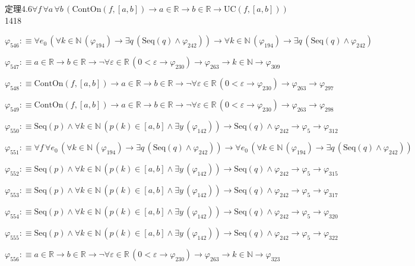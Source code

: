 \begin{fullproof}{定理4.6}{$\forall f\,\forall a\,\forall b\,(\mathrm{ContOn}(f,[a,b]) \to a \in \mathbb{R} \to b \in \mathbb{R} \to \mathrm{UC}(f,[a,b]))$}{1418}
\begin{abbrevlist}
\item $\varphi_{546} :\equiv \forall e_{0}\,(\forall k \in \mathbb{N}\,(\varphi_{194}) \to \exists q\,(\mathrm{Seq}(q) \land \varphi_{242})) \to \forall k \in \mathbb{N}\,(\varphi_{194}) \to \exists q\,(\mathrm{Seq}(q) \land \varphi_{242})$
\item $\varphi_{547} :\equiv a \in \mathbb{R} \to b \in \mathbb{R} \to \neg \forall \varepsilon \in \mathbb{R}\,(0 < \varepsilon \to \varphi_{230}) \to \varphi_{263} \to k \in \mathbb{N} \to \varphi_{309}$
\item $\varphi_{548} :\equiv \mathrm{ContOn}(f,[a,b]) \to a \in \mathbb{R} \to b \in \mathbb{R} \to \neg \forall \varepsilon \in \mathbb{R}\,(0 < \varepsilon \to \varphi_{230}) \to \varphi_{263} \to \varphi_{297}$
\item $\varphi_{549} :\equiv \mathrm{ContOn}(f,[a,b]) \to a \in \mathbb{R} \to b \in \mathbb{R} \to \neg \forall \varepsilon \in \mathbb{R}\,(0 < \varepsilon \to \varphi_{230}) \to \varphi_{263} \to \varphi_{298}$
\item $\varphi_{550} :\equiv \mathrm{Seq}(p) \land \forall k \in \mathbb{N}\,(p(k) \in [a,b] \land \exists y\,(\varphi_{142})) \to \mathrm{Seq}(q) \land \varphi_{242} \to \varphi_{5} \to \varphi_{312}$
\item $\varphi_{551} :\equiv \forall f\,\forall e_{0}\,(\forall k \in \mathbb{N}\,(\varphi_{194}) \to \exists q\,(\mathrm{Seq}(q) \land \varphi_{242})) \to \forall e_{0}\,(\forall k \in \mathbb{N}\,(\varphi_{194}) \to \exists q\,(\mathrm{Seq}(q) \land \varphi_{242}))$
\item $\varphi_{552} :\equiv \mathrm{Seq}(p) \land \forall k \in \mathbb{N}\,(p(k) \in [a,b] \land \exists y\,(\varphi_{142})) \to \mathrm{Seq}(q) \land \varphi_{242} \to \varphi_{5} \to \varphi_{315}$
\item $\varphi_{553} :\equiv \mathrm{Seq}(p) \land \forall k \in \mathbb{N}\,(p(k) \in [a,b] \land \exists y\,(\varphi_{142})) \to \mathrm{Seq}(q) \land \varphi_{242} \to \varphi_{5} \to \varphi_{317}$
\item $\varphi_{554} :\equiv \mathrm{Seq}(p) \land \forall k \in \mathbb{N}\,(p(k) \in [a,b] \land \exists y\,(\varphi_{142})) \to \mathrm{Seq}(q) \land \varphi_{242} \to \varphi_{5} \to \varphi_{320}$
\item $\varphi_{555} :\equiv \mathrm{Seq}(p) \land \forall k \in \mathbb{N}\,(p(k) \in [a,b] \land \exists y\,(\varphi_{142})) \to \mathrm{Seq}(q) \land \varphi_{242} \to \varphi_{5} \to \varphi_{322}$
\item $\varphi_{556} :\equiv a \in \mathbb{R} \to b \in \mathbb{R} \to \neg \forall \varepsilon \in \mathbb{R}\,(0 < \varepsilon \to \varphi_{230}) \to \varphi_{263} \to k \in \mathbb{N} \to \varphi_{323}$

\end{abbrevlist}
\end{fullproof}
